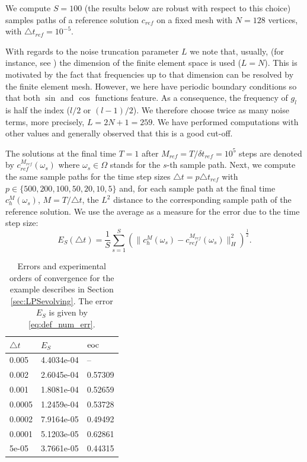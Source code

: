 \documentclass[a4paper,10pt]{article}
\def\eoc{{\rm eoc}}
\numberwithin{equation}{section}
\begin{document}
We compute $S = 100$ (the results below are robust with respect to this choice) samples paths of a reference solution $c_{ref}$ on a fixed mesh with $N = 128$ vertices, with $\triangle t_{ref} = 10^{-5}$. 

With regards to the noise truncation parameter $L$ we note that, usually, (for instance, see \cite{Powell,BDE}) the dimension of the finite element space is used ($L = N$). This is motivated by the fact that frequencies up to that dimension can be resolved by the finite element mesh. However, we here have periodic boundary conditions so that both $\sin$ and $\cos$ functions feature. As a consequence, the frequency of $g_l$ is half the index ($l/2$ or $(l-1)/2$). We therefore choose twice as many noise terms, more precisely, $L = 2N+1 = 259$. We have performed computations with other values and generally observed that this is a good cut-off.

The solutions at the final time $T = 1$ after $M_{ref} = T / \delta t_{ref} = 10^5$ steps are denoted by $c_{ref}^{M_{ref}}(\omega_s)$ where $\omega_s \in \Omega$ stands for the $s$-th sample path.
Next, we compute the same sample paths for the time step sizes $\triangle t = p \triangle t_{ref}$ with $p \in \{ 500, 200, 100, 50, 20, 10, 5 \}$ and, for each sample path at the final time $c_{h}^{M}(\omega_s)$, $M = T/\triangle t$, the $L^2$ distance to the corresponding sample path of the reference solution. We use the average as a measure for the error due to the time step size:
\begin{equation} \label{eq:def_num_err}
 E_S(\triangle t) = \frac{1}{S} \sum_{s=1}^S (\| c^{M}_{h}(\omega_s) - c^{M_{ref}}_{ref} (\omega_s) \|_{H}^{2})^{\frac{1}{2}}.
\end{equation}

\begin{table}
\begin{center}
\begin{tabular}{|l|l|l|} \hline
$\triangle t$ & $E_S$ & $\eoc$ \\ \hline \hline
     0.005   &  4.4034e-04  &         -- \\ \hline
     0.002   &  2.6045e-04  &    0.57309 \\ \hline
     0.001   &  1.8081e-04  &    0.52659 \\ \hline
     0.0005  &  1.2459e-04  &    0.53728 \\ \hline
     0.0002  &  7.9164e-05  &    0.49492 \\ \hline
     0.0001  &  5.1203e-05  &    0.62861 \\ \hline
     5e-05   &  3.7661e-05  &    0.44315 \\ \hline
\end{tabular}
\end{center}
\caption{Errors and experimental orders of convergence for the example describes in Section \ref{sec:LPSevolving}.
The error $E_S$ is given by \eqref{eq:def_num_err}.
}
\label{tab:conv_LPSevolving}
\end{table}
\end{document}

